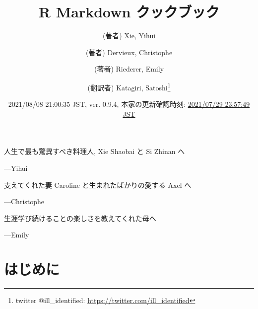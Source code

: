 \documentclass[
  11pt,
  lualatex,ja=standard,jafont=noto]{bxjsreport}
\title{R Markdown クックブック}
\author{(著者) Xie, Yihui \and (著者) Dervieux, Christophe \and (著者) Riederer, Emily \and (翻訳者) Katagiri, Satoshi\footnote{twitter @ill\_identified: \url{https://twitter.com/ill_identified}}}
\date{2021/08/08 21:00:35 JST, ver. 0.9.4, 本家の更新確認時刻: \href{https://github.com/yihui/rmarkdown-cookbook}{2021/07/29 23:57:49 JST}}
\begin{document}
\maketitle

\cleardoublepage\newpage\thispagestyle{empty}\null
\cleardoublepage\newpage\thispagestyle{empty}\null
\thispagestyle{empty}
\begin{large}
人生で最も驚異すべき料理人, Xie Shaobai と Si Zhinan へ
\begin{flushright}
---Yihui
\end{flushright}

\bigskip

支えてくれた妻 Caroline と生まれたばかりの愛する Axel へ
\begin{flushright}
---Christophe
\end{flushright}

\bigskip

生涯学び続けることの楽しさを教えてくれた母へ
\begin{flushright}
---Emily
\end{flushright}
\end{large}

\setlength{\abovedisplayskip}{-5pt}
\setlength{\abovedisplayshortskip}{-5pt}

{
\hypersetup{linkcolor=}
\setcounter{tocdepth}{2}
\tableofcontents
}
\listoftables
\listoffigures
\hypertarget{ux306fux3058ux3081ux306b}{%
\chapter*{はじめに}\label{ux306fux3058ux3081ux306b}}
\end{document}
